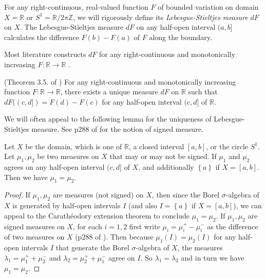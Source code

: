 For any right-continuous, real-valued function \(F\) of bounded variation on domain \(X = \mathbb{R}\) or \(S^1 = \mathbb{R} / 2\pi \mathbb{Z}\), we will rigorously define its \emph{Lebesgue-Stieltjes measure} \(dF\) on \(X\). The Lebesgue-Stieltjes measure \(dF\) on any half-open interval \((a, b]\) calculates the difference \(F(b) - F(a)\) of \(F\) along the boundary.

Most literature constructs \(dF\) for any right-continuous and monotonically increasing \(F : \mathbb{R} \to \mathbb{R}\) \autocite{steinRealAnalysisMeasure2005,hewittRealAbstractAnalysis1965,halmos2013measure}.

\begin{theorem}

(Theorem 3.5. of \autocite{steinRealAnalysisMeasure2005}) For any right-continuous and monotonically increasing function \(F : \mathbb{R} \to \mathbb{R}\), there exists a unique measure \(dF\) on \(\mathbb{R}\) such that \(dF((c, d]) = F(d) - F(c)\) for any half-open interval \((c, d]\) of \(\mathbb{R}\).

\label{thm:lebesgue-stieltjes}
\end{theorem}

We will often appeal to the following lemma for the uniqueness of Lebesgue-Stieltjes measure. See p288 of \autocite{steinRealAnalysisMeasure2005} for the notion of signed measure.

\begin{lemma}

Let \(X\) be the domain, which is one of \(\mathbb{R}\), a closed interval \([a, b]\), or the circle \(S^1\). Let \(\mu_1, \mu_2\) be two measures on \(X\) that may or may not be signed. If \(\mu_1\) and \(\mu_2\) agrees on any half-open interval \((c, d]\) of \(X\), and additionally \(\left\{ a \right\}\) if \(X = [a, b]\). Then we have \(\mu_1 = \mu_2\).

\label{lem:measure-interval-uniqueness}
\end{lemma}

\begin{proof}
If \(\mu_1, \mu_2\) are measures (not signed) on \(X\), then since the Borel \(\sigma\)-algebra of \(X\) is generated by half-open intervals \(I\) (and also \(I = \left\{ a \right\}\) if \(X = [a, b]\)), we can appeal to the Carathéodory extension theorem to conclude \(\mu_1 = \mu_2\). If \(\mu_1, \mu_2\) are signed measures on \(X\), for each \(i=1, 2\) first write \(\mu_i = \mu_i^+ - \mu_i^-\) as the difference of two measures on \(X\) (p288 of \autocite{steinRealAnalysisMeasure2005}). Then because \(\mu_1(I) = \mu_2(I)\) for any half-open intervals \(I\) that generate the Borel \(\sigma\)-algebra of \(X\), the measures \(\lambda_1 = \mu_1^+ + \mu_2^-\) and \(\lambda_2 = \mu_2^+ + \mu_1^-\) agree on \(I\). So \(\lambda_1 = \lambda_2\) and in turn we have \(\mu_1 = \mu_2\).
\end{proof}

